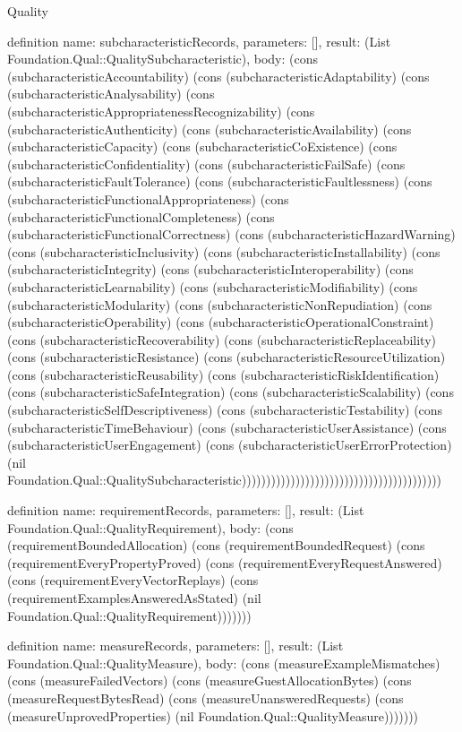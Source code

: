 \begin{lexlean}{Quality}
\begin{semanticmodule}
definition{
  name: subcharacteristicRecords,
  parameters: [],
  result: (List Foundation.Qual::QualitySubcharacteristic),
  body: (cons (subcharacteristicAccountability) (cons (subcharacteristicAdaptability) (cons (subcharacteristicAnalysability) (cons (subcharacteristicAppropriatenessRecognizability) (cons (subcharacteristicAuthenticity) (cons (subcharacteristicAvailability) (cons (subcharacteristicCapacity) (cons (subcharacteristicCoExistence) (cons (subcharacteristicConfidentiality) (cons (subcharacteristicFailSafe) (cons (subcharacteristicFaultTolerance) (cons (subcharacteristicFaultlessness) (cons (subcharacteristicFunctionalAppropriateness) (cons (subcharacteristicFunctionalCompleteness) (cons (subcharacteristicFunctionalCorrectness) (cons (subcharacteristicHazardWarning) (cons (subcharacteristicInclusivity) (cons (subcharacteristicInstallability) (cons (subcharacteristicIntegrity) (cons (subcharacteristicInteroperability) (cons (subcharacteristicLearnability) (cons (subcharacteristicModifiability) (cons (subcharacteristicModularity) (cons (subcharacteristicNonRepudiation) (cons (subcharacteristicOperability) (cons (subcharacteristicOperationalConstraint) (cons (subcharacteristicRecoverability) (cons (subcharacteristicReplaceability) (cons (subcharacteristicResistance) (cons (subcharacteristicResourceUtilization) (cons (subcharacteristicReusability) (cons (subcharacteristicRiskIdentification) (cons (subcharacteristicSafeIntegration) (cons (subcharacteristicScalability) (cons (subcharacteristicSelfDescriptiveness) (cons (subcharacteristicTestability) (cons (subcharacteristicTimeBehaviour) (cons (subcharacteristicUserAssistance) (cons (subcharacteristicUserEngagement) (cons (subcharacteristicUserErrorProtection) (nil Foundation.Qual::QualitySubcharacteristic)))))))))))))))))))))))))))))))))))))))))
}

definition{
  name: requirementRecords,
  parameters: [],
  result: (List Foundation.Qual::QualityRequirement),
  body: (cons (requirementBoundedAllocation) (cons (requirementBoundedRequest) (cons (requirementEveryPropertyProved) (cons (requirementEveryRequestAnswered) (cons (requirementEveryVectorReplays) (cons (requirementExamplesAnsweredAsStated) (nil Foundation.Qual::QualityRequirement)))))))
}

definition{
  name: measureRecords,
  parameters: [],
  result: (List Foundation.Qual::QualityMeasure),
  body: (cons (measureExampleMismatches) (cons (measureFailedVectors) (cons (measureGuestAllocationBytes) (cons (measureRequestBytesRead) (cons (measureUnansweredRequests) (cons (measureUnprovedProperties) (nil Foundation.Qual::QualityMeasure)))))))
}


\end{semanticmodule}
\end{lexlean}

